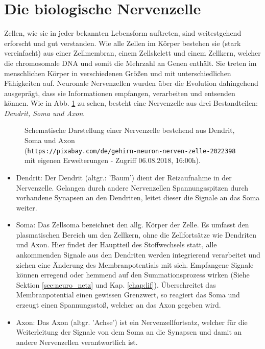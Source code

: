 \section{Die biologische Nervenzelle}
\label{sec:neuro_nervenzelle}
	Zellen, wie sie in jeder bekannten Lebensform auftreten, sind weitestgehend erforscht und gut verstanden. Wie alle Zellen im Körper bestehen sie (stark vereinfacht) aus einer Zellmembran, einem Zellskelett und einem Zellkern, welcher die chromosomale DNA und somit die Mehrzahl an Genen enthält. Sie treten im menschlichen Körper in verschiedenen Größen und mit unterschiedlichen Fähigkeiten auf. Neuronale Nervenzellen wurden über die Evolution dahingehend ausgeprägt, dass sie Informationen empfangen, verarbeiten und entsenden können. Wie in Abb. \ref{fig:neuron} zu sehen, besteht eine Nervenzelle aus drei Bestandteilen: \textit{Dendrit, Soma und Axon}.
	\begin{figure}[H] %
		\centering
		\def\svgwidth{12cm}
		
		\caption{Schematische Darstellung einer Nervenzelle bestehend aus Dendrit, Soma und Axon\\(\texttt{https://pixabay.com/de/gehirn-neuron-nerven-zelle-2022398} mit eigenen Erweiterungen - Zugriff 06.08.2018, 16:00h).}
		\label{fig:neuron}
	\end{figure}
	\begin{itemize}
		\item Dendrit:
			\subitem Der Dendrit (altgr.: 'Baum') dient der Reizaufnahme in der Nervenzelle. Gelangen durch andere Nervenzellen Spannungsspitzen durch vorhandene Synapsen an den Dendriten, leitet dieser die Signale an das Soma weiter.
		\item Soma:
			\subitem Das Zellsoma bezeichnet den allg. Körper der Zelle. Es umfasst den plasmatischen Bereich um den Zellkern, ohne die Zellfortsätze wie Dendriten und Axon. Hier findet der Hauptteil des Stoffwechsels statt, alle ankommenden Signale aus den Dendriten werden integrierend verarbeitet und ziehen eine Änderung des Membranpotentials mit sich. Empfangene Signale können erregend oder hemmend auf den Summationsprozess wirken (Siehe Sektion \ref{sec:neuro_netz} und Kap. \ref{chap:lif}). Überschreitet das Membranpotential einen gewissen Grenzwert, so reagiert das Soma und erzeugt einen Spannungsstoß, welcher an das Axon gegeben wird.
		\item Axon:
			\subitem Das Axon (altgr. 'Achse') ist ein Nervenzellfortsatz, welcher für die Weiterleitung der Signale von dem Soma an die Synapsen und damit an andere Nervenzellen verantwortlich ist.
	\end{itemize}
